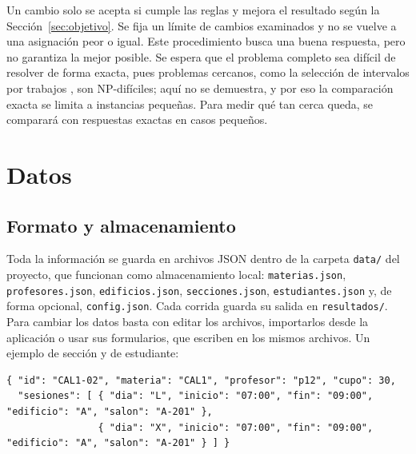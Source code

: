 \documentclass[pdflatex,sn-mathphys-num]{sn-jnl}%
\begin{document}
Un cambio solo se acepta si cumple las reglas y mejora el resultado según la Sección~\ref{sec:objetivo}. Se fija un límite de cambios examinados y no se vuelve a una asignación peor o igual. Este procedimiento busca una buena respuesta, pero no garantiza la mejor posible. Se espera que el problema completo sea difícil de resolver de forma exacta, pues problemas cercanos, como la selección de intervalos por trabajos \cite{spieksma1999}, son NP-difíciles; aquí no se demuestra, y por eso la comparación exacta se limita a instancias pequeñas. Para medir qué tan cerca queda, se comparará con respuestas exactas en casos pequeños.

\section{Datos}\label{sec:datos}

\subsection{Formato y almacenamiento}

\begin{sloppypar}
Toda la información se guarda en archivos JSON dentro de la carpeta \texttt{data/} del proyecto, que funcionan como almacenamiento local: \texttt{materias.json}, \texttt{profesores.json}, \texttt{edificios.json}, \texttt{secciones.json}, \texttt{estudiantes.json} y, de forma opcional, \texttt{config.json}. Cada corrida guarda su salida en \texttt{resultados/}. Para cambiar los datos basta con editar los archivos, importarlos desde la aplicación o usar sus formularios, que escriben en los mismos archivos. Un ejemplo de sección y de estudiante:
\end{sloppypar}

\begin{minipage}{\textwidth}
\begin{lstlisting}[style=json]
{ "id": "CAL1-02", "materia": "CAL1", "profesor": "p12", "cupo": 30,
  "sesiones": [ { "dia": "L", "inicio": "07:00", "fin": "09:00", "edificio": "A", "salon": "A-201" },
                { "dia": "X", "inicio": "07:00", "fin": "09:00", "edificio": "A", "salon": "A-201" } ] }
\end{lstlisting}
\end{minipage}
\end{document}
